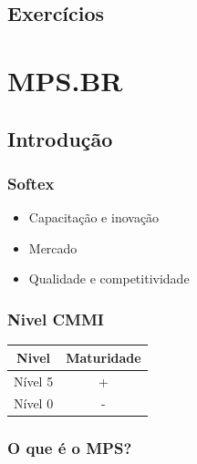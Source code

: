 \documentclass{article}
\begin{document}
\subsection{Exercícios}

\section{MPS.BR} 
\subsection{Introdução} \date{26 de Março de 2014}


\subsubsection{Softex} 
	\begin{itemize}
	\item Capacitação e inovação
	\item Mercado
	\item Qualidade e competitividade
	\end{itemize}
	
\subsubsection{Nivel CMMI}
	
\begin{center}

\begin{tabular}{|c|c|}
\hline 
Nivel & Maturidade \\ 
\hline 
Nível 5 & + \\ 
\hline 
Nível 0 & - \\ 
\hline 
\end{tabular} 

\end{center}

	
\subsubsection{O que é o MPS?} 
	
\end{document}
